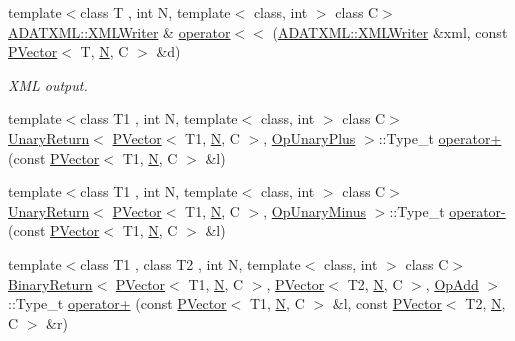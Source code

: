 \begin{DoxyCompactItemize}
{\footnotesize template$<$class T , int N, template$<$ class, int $>$ class C$>$ }\\\mbox{\hyperlink{classADATXML_1_1XMLWriter}{A\+D\+A\+T\+X\+M\+L\+::\+X\+M\+L\+Writer}} \& \mbox{\hyperlink{group__primvector_ga5f643f72b00ff82d7abfb2a42401c045}{operator$<$$<$}} (\mbox{\hyperlink{classADATXML_1_1XMLWriter}{A\+D\+A\+T\+X\+M\+L\+::\+X\+M\+L\+Writer}} \&xml, const \mbox{\hyperlink{classENSEM_1_1PVector}{P\+Vector}}$<$ T, \mbox{\hyperlink{operator__name__util_8cc_a7722c8ecbb62d99aee7ce68b1752f337}{N}}, C $>$ \&d)
\begin{DoxyCompactList}\small\item\em X\+ML output. \end{DoxyCompactList}\item 
{\footnotesize template$<$class T1 , int N, template$<$ class, int $>$ class C$>$ }\\\mbox{\hyperlink{structENSEM_1_1UnaryReturn}{Unary\+Return}}$<$ \mbox{\hyperlink{classENSEM_1_1PVector}{P\+Vector}}$<$ T1, \mbox{\hyperlink{operator__name__util_8cc_a7722c8ecbb62d99aee7ce68b1752f337}{N}}, C $>$, \mbox{\hyperlink{structENSEM_1_1OpUnaryPlus}{Op\+Unary\+Plus}} $>$\+::Type\+\_\+t \mbox{\hyperlink{group__primvector_gadeef49e413dc749206be2cdd675cd802}{operator+}} (const \mbox{\hyperlink{classENSEM_1_1PVector}{P\+Vector}}$<$ T1, \mbox{\hyperlink{operator__name__util_8cc_a7722c8ecbb62d99aee7ce68b1752f337}{N}}, C $>$ \&l)
\item 
{\footnotesize template$<$class T1 , int N, template$<$ class, int $>$ class C$>$ }\\\mbox{\hyperlink{structENSEM_1_1UnaryReturn}{Unary\+Return}}$<$ \mbox{\hyperlink{classENSEM_1_1PVector}{P\+Vector}}$<$ T1, \mbox{\hyperlink{operator__name__util_8cc_a7722c8ecbb62d99aee7ce68b1752f337}{N}}, C $>$, \mbox{\hyperlink{structENSEM_1_1OpUnaryMinus}{Op\+Unary\+Minus}} $>$\+::Type\+\_\+t \mbox{\hyperlink{group__primvector_ga7f5358cd7aff24dea49436228e259ade}{operator-\/}} (const \mbox{\hyperlink{classENSEM_1_1PVector}{P\+Vector}}$<$ T1, \mbox{\hyperlink{operator__name__util_8cc_a7722c8ecbb62d99aee7ce68b1752f337}{N}}, C $>$ \&l)
\item 
{\footnotesize template$<$class T1 , class T2 , int N, template$<$ class, int $>$ class C$>$ }\\\mbox{\hyperlink{structENSEM_1_1BinaryReturn}{Binary\+Return}}$<$ \mbox{\hyperlink{classENSEM_1_1PVector}{P\+Vector}}$<$ T1, \mbox{\hyperlink{operator__name__util_8cc_a7722c8ecbb62d99aee7ce68b1752f337}{N}}, C $>$, \mbox{\hyperlink{classENSEM_1_1PVector}{P\+Vector}}$<$ T2, \mbox{\hyperlink{operator__name__util_8cc_a7722c8ecbb62d99aee7ce68b1752f337}{N}}, C $>$, \mbox{\hyperlink{structENSEM_1_1OpAdd}{Op\+Add}} $>$\+::Type\+\_\+t \mbox{\hyperlink{group__primvector_gaec1b75dc112e9c2300475f1dddbff722}{operator+}} (const \mbox{\hyperlink{classENSEM_1_1PVector}{P\+Vector}}$<$ T1, \mbox{\hyperlink{operator__name__util_8cc_a7722c8ecbb62d99aee7ce68b1752f337}{N}}, C $>$ \&l, const \mbox{\hyperlink{classENSEM_1_1PVector}{P\+Vector}}$<$ T2, \mbox{\hyperlink{operator__name__util_8cc_a7722c8ecbb62d99aee7ce68b1752f337}{N}}, C $>$ \&r)

\end{DoxyCompactItemize}
